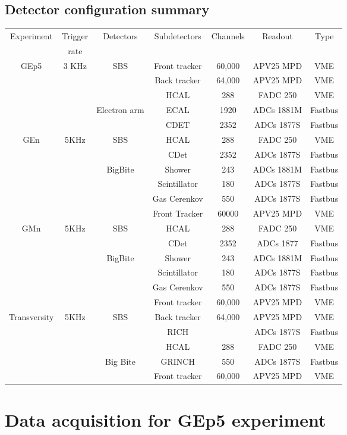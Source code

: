 \documentclass{article}
\begin{document}
\subsection{Detector configuration summary}
\begin{tabular}{|c|c|c|c|c|c|c|}
\hline
Experiment&Trigger & Detectors & Subdetectors & Channels& Readout & Type \\
&rate&&&&&\\
\hline
GEp5& 3 KHz  & SBS & Front tracker & 60,000 & APV25 MPD& VME\\ 
 && & Back tracker & 64,000& APV25 MPD& VME\\
 && & HCAL & 288 & FADC 250 &VME\\
 & & Electron arm& ECAL & 1920 & ADCs 1881M&Fastbus\\ 
 &&              & CDET & 2352 & ADCs 1877S &Fastbus \\ 
\hline
GEn& 5KHz & SBS & HCAL & 288 & FADC 250 &VME\\ 
 &    &   & CDet & 2352 & ADCs 1877S&Fastbus\\ 
 && BigBite& Shower & 243 & ADCs 1881M&Fastbus\\ 
 && & Scintillator & 180& ADCs 1877S&Fastbus\\ 
 && & Gas Cerenkov & 550& ADCs 1877S&Fastbus\\ 
 && & Front Tracker & 60000& APV25 MPD &VME\\ 
\hline
GMn& 5KHz & SBS & HCAL & 288 & FADC 250 &VME\\ 
   &  &   & CDet & 2352 & ADCs 1877&Fastbus\\ 
 && BigBite& Shower & 243 & ADCs 1881M&Fastbus\\ 
 && & Scintillator & 180 & ADCs 1877S&Fastbus\\ 
 &&& Gas Cerenkov & 550 & ADCs 1877S&Fastbus\\ 
 &&& Front tracker & 60,000 &APV25 MPD& VME\\ 
\hline
Transversity &5KHz& SBS & Back tracker &64,000&APV25 MPD& VME\\
 &&  & RICH & & ADCs 1877S&Fastbus\\
 &&  & HCAL & 288 & FADC 250 &VME\\ 
 && Big Bite & GRINCH&550 &  ADCs 1877S&Fastbus\\
 &&  & Front tracker & 60,000& APV25 MPD &VME\\
\hline
\end{tabular}




\section{Data acquisition for GEp5 experiment}
\end{document}

